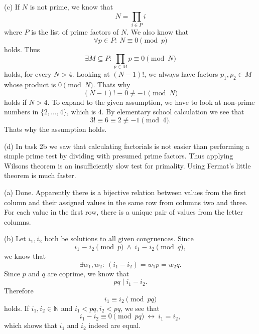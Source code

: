 \documentclass[12pt]{article}
\begin{document}
 (c) If $N$ is not prime, we know that \begin{equation}
 	N = \prod_{i\in P} i
 \end{equation} where $P$ is the list of prime factors of $N$. We also know that \begin{equation}
 	\forall p\in P:\ N \equiv 0 \pmod{p}
 \end{equation} holds. Thus \begin{equation}
 	\exists M\subseteq P: \prod_{p\in M}p \equiv 0 \pmod{N}
 \end{equation} holds, for every $N>4$. Looking at $(N-1)!$, we always have factors $p_1,p_2\in M$ whose product is $0 \pmod N$. Thats why \begin{equation}
 	(N-1)!\equiv 0 \not\equiv -1 \pmod{N}
 \end{equation} holds if $N>4$. To expand to the given assumption, we have to look at non-prime numbers in $\{2,\ldots, 4\}$, which is $4$. By elementary school calculation we see that \begin{equation}
 	3!\equiv 6\equiv 2\not\equiv -1\pmod{4}.
 \end{equation} Thats why the assumption holds.
 
 (d) In task 2b we saw that calculating factorials is not easier than performing a simple prime test by dividing with presumed prime factors. Thus applying Wilsons theorem is an insufficiently slow test for primality. Using Fermat's little theorem is much faster.
 
 (a) Done. Apparently there is a bijective relation between values from the first column and their assigned values in the same row from columns two and three. For each value in the first row, there is a unique pair of values from the letter columns.

 (b) Let $i_1,i_2$ both be solutions to all given congruences. Since \begin{equation}
 	i_1\equiv i_2\pmod{p}\ \land\ i_1\equiv i_2\pmod{q},
 \end{equation} we know that \begin{equation}
 	\exists w_1,w_2:\ (i_1-i_2)=w_1p=w_2q.
 \end{equation} Since $p$ and $q$ are coprime, we know that \begin{equation}
 	pq \mid i_1-i_2.
 \end{equation} Therefore \begin{equation}
 	i_1\equiv i_2\pmod{pq}
 \end{equation} holds. If $i_1,i_2\in\mathbb{N}$ and $i_1<pq, i_2<pq$, we see that \begin{equation}
 	i_1-i_2\equiv 0 \pmod{pq}\ \leftrightarrow\ i_1=i_2,
 \end{equation} which shows that $i_1$ and $i_2$ indeed are equal.
 
\end{document}
